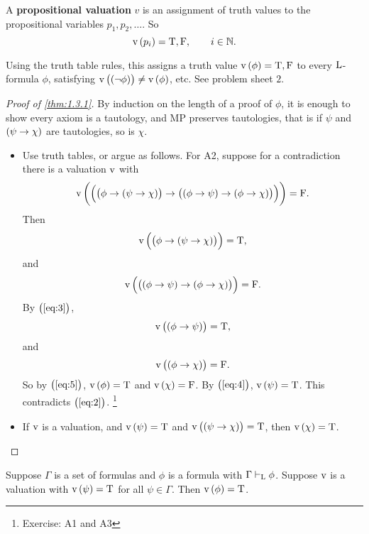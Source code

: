 \begin{definition}
A \textbf{propositional valuation} $ v $ is an assignment of truth values to the propositional variables $ p_1, p_2, \dots $. So
$$ \v\br{p_i} = \T, \F, \qquad i \in \NN. $$
\end{definition}

\begin{note*}
Using the truth table rules, this assigns a truth value $ \v\br{\phi} = \T, \F $ to every $ \mathrm{L} $-formula $ \phi $, satisfying $ \v\br{\notb{\phi}} \ne \v\br{\phi} $, etc. See problem sheet $ 2 $.
\end{note*}

\pagebreak

\begin{proof}[Proof of \ref{thm:1.3.1}]
By induction on the length of a proof of $ \phi $, it is enough to show every axiom is a tautology, and MP preserves tautologies, that is if $ \psi $ and $ \impb{\psi}{\chi} $ are tautologies, so is $ \chi $.
\begin{itemize}
\item Use truth tables, or argue as follows. For A2, suppose for a contradiction there is a valuation $ \mathrm{v} $ with
$$ \v\br{\impb{\impb{\phi}{\impb{\psi}{\chi}}}{\impb{\impb{\phi}{\psi}}{\impb{\phi}{\chi}}}} = \F. $$
Then
\begin{equation}
\label{eq:2}
\v\br{\impb{\phi}{\impb{\psi}{\chi}}} = \T,
\end{equation}
and
\begin{equation}
\label{eq:3}
\v\br{\impb{\impb{\phi}{\psi}}{\impb{\phi}{\chi}}} = \F.
\end{equation}
By $ \br{\ref{eq:3}} $,
\begin{equation}
\label{eq:4}
\v\br{\impb{\phi}{\psi}} = \T,
\end{equation}
and
\begin{equation}
\label{eq:5}
\v\br{\impb{\phi}{\chi}} = \F.
\end{equation}
So by $ \br{\ref{eq:5}} $, $ \v\br{\phi} = \T $ and $ \v\br{\chi} = \F $. By $ \br{\ref{eq:4}} $, $ \v\br{\psi} = \T $. This contradicts $ \br{\ref{eq:2}} $. \footnote{Exercise: A1 and A3}
\item If $ \mathrm{v} $ is a valuation, and $ \v\br{\psi} = \T $ and $ \v\br{\impb{\psi}{\chi}} = \T $, then $ \v\br{\chi} = \T $.
\end{itemize}
\end{proof}

\begin{theorem}
Suppose $ \Gamma $ is a set of formulas and $ \phi $ is a formula with $ \Gamma \vdash_{\mathrm{L}} \phi $. Suppose $ \mathrm{v} $ is a valuation with $ \v\br{\psi} = \T $ for all $ \psi \in \Gamma $. Then $ \v\br{\phi} = \T $.
\end{theorem}

